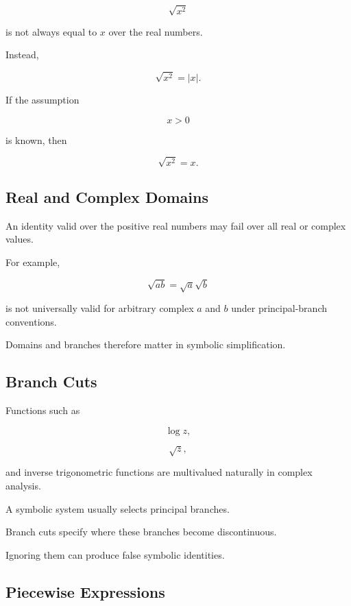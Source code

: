 \[
\sqrt{x^2}
\]

is not always equal to \(x\) over the real numbers.

Instead,

\[
\boxed{
\sqrt{x^2}
=
|x|.
}
\]

If the assumption

\[
x>0
\]

is known, then

\[
\boxed{
\sqrt{x^2}=x.
}
\]

\subsection{Real and Complex Domains}
\label{subsec:real-complex-symbolic-domains}

An identity valid over the positive real numbers may fail over all real or
complex values.

For example,

\[
\boxed{
\sqrt{ab}
=
\sqrt{a}\sqrt{b}
}
\]

is not universally valid for arbitrary complex \(a\) and \(b\) under
principal-branch conventions.

Domains and branches therefore matter in symbolic simplification.

\subsection{Branch Cuts}
\label{subsec:symbolic-branch-cuts}

Functions such as

\[
\log z,
\]

\[
\sqrt{z},
\]

and inverse trigonometric functions are multivalued naturally in complex
analysis.

A symbolic system usually selects principal branches.

Branch cuts specify where these branches become discontinuous.

Ignoring them can produce false symbolic identities.

\subsection{Piecewise Expressions}
\label{subsec:symbolic-piecewise-expressions}

